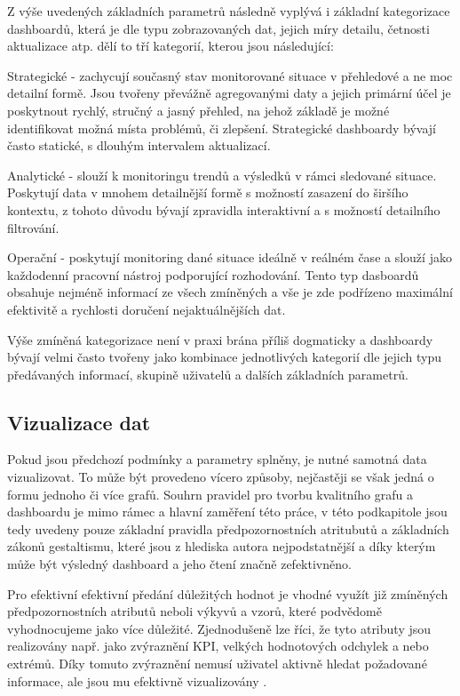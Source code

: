 \documentclass[
  digital,     %
  twoside,     %
  lof,         %
  lot,         %
]{fithesis4}
\begin{document}
Z výše uvedených základních parametrů následně vyplývá i základní kategorizace dashboardů, která je dle typu zobrazovaných dat, jejich míry detailu, četnosti aktualizace atp. dělí to tří kategorií, kterou jsou následující\parencite[s.~3]{Faron2016thesis}:
\begin{compactitem}
    \item Strategické - zachycují současný stav monitorované situace v přehledové a ne moc detailní formě. Jsou tvořeny převážně agregovanými daty a jejich primární účel je poskytnout rychlý, stručný a jasný přehled, na jehož základě je možné identifikovat možná místa problémů, či zlepšení. Strategické dashboardy bývají často statické, s dlouhým intervalem aktualizací.
    \item Analytické - slouží k monitoringu trendů a výsledků v rámci sledované situace. Poskytují data v mnohem detailnější formě s možností zasazení do širšího kontextu, z tohoto důvodu bývají zpravidla interaktivní a s možností detailního filtrování.
    \item Operační - poskytují monitoring dané situace ideálně v reálném čase a slouží jako každodenní pracovní nástroj podporující rozhodování. Tento typ dasboardů obsahuje nejméně informací ze všech zmíněných a vše je zde podřízeno maximální efektivitě a rychlosti doručení nejaktuálnějších dat.  
\end{compactitem}

Výše zmíněná kategorizace není v praxi brána příliš dogmaticky a dashboardy bývají velmi často tvořeny jako kombinace jednotlivých kategorií dle jejich typu předávaných informací, skupině uživatelů a dalších základních parametrů.

\subsection{Vizualizace dat}
Pokud jsou předchozí podmínky a parametry splněny, je nutné samotná data vizualizovat. To může být provedeno vícero způsoby, nejčastěji se však jedná o formu jednoho či více grafů. Souhrn pravidel pro tvorbu kvalitního grafu a dashboardu je mimo rámec a hlavní zaměření této práce, v této podkapitole jsou tedy uvedeny pouze základní pravidla předpozornostních atritubutů a základních zákonů gestaltismu, které jsou z hlediska autora nejpodstatnější a díky kterým může být výsledný dashboard a jeho čtení značně zefektivněno. 

Pro efektivní efektivní předání důležitých hodnot je vhodné využít již zmíněných předpozornostních atributů neboli výkyvů a vzorů, které podvědomě vyhodnocujeme jako více důležité. Zjednodušeně lze říci, že tyto atributy jsou realizovány např. jako zvýraznění KPI, velkých hodnotových odchylek a nebo extrémů. Díky tomuto zvýraznění nemusí uživatel aktivně hledat požadované informace, ale jsou mu efektivně vizualizovány \parencite[s.~70]{Marek2015thesis}.
\end{document}
